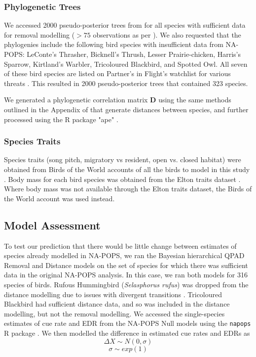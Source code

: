 \documentclass[12pt]{article}
\begin{document}
\subsubsection{Phylogenetic Trees}
\par We accessed 2000 pseudo-posterior trees from \citet{jetz_global_2012} for all species with sufficient data for removal modelling ($>75$ observations as per \cite{edwards_point_2023,solymos_evaluating_2018,buckland_introduction_2001}). 
We also requested that the phylogenies include the following bird species with insufficient data from NA-POPS: LeConte's Thrasher, Bicknell's Thrush, Lesser Prairie-chicken, Harris's Sparrow, Kirtland's Warbler, Tricoloured Blackbird, and Spotted Owl. 
All seven of these bird species are listed on Partner's in Flight's watchlist for various threats \citep{will_handbook_2020}. 
This resulted in 2000 pseudo-posterior trees that contained 323 species.

\par We generated a phylogenetic correlation matrix $\mathbf{D}$ using the same methods outlined in the Appendix of \citet{solymos_phylogeny_2018} that generate distances between species, and further processed using the R package "ape" \citet{paradis_ape_2019}.

\subsubsection{Species Traits}
\par Species traits (song pitch, migratory vs resident, open vs. closed habitat) were obtained from Birds of the World accounts of all the birds to model in this study \citep{billerman_birds_2022}. 
Body mass for each bird species was obtained from the Elton traits dataset \citep{wilman_eltontraits_2014}. 
Where body mass was not available through the Elton traits dataset, the Birds of the World account \citep{billerman_birds_2022} was used instead.

\subsection{Model Assessment}

\par To test our prediction that there would be little change between estimates of species already modelled in NA-POPS, we ran the Bayesian hierarchical QPAD Removal and Distance models on the set of species for which there was sufficient data in the original NA-POPS analysis.
In this case, we ran both models for 316 species of birds.
Rufous Hummingbird (\textit{Selasphorus rufus}) was dropped from the distance modelling due to issues with divergent transitions \citep{betancourt_diagnosing_2016, leimkuhler_simulating_2005}.
Tricoloured Blackbird had sufficient distance data, and so was included in the distance modelling, but not the removal modelling.
We accessed the single-species estimates of cue rate and EDR from the NA-POPS Null models using the \texttt{napops} R package \citep{edwards_napops_2023, edwards_point_2023}.
We then modelled the difference in estimated cue rates and EDRs as
$$\Delta X \sim N(0,\sigma)$$
$$\sigma \sim exp(1)$$
\end{document}
